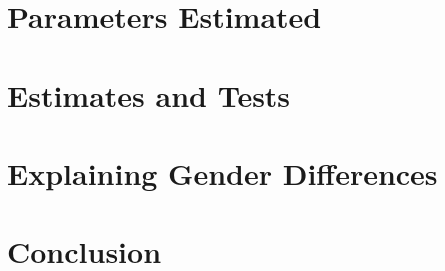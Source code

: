 \section{Parameters Estimated}
\label{sec:parameters}


\section{Estimates and Tests}
\label{sec:treatment-effects}


\section{Explaining Gender Differences}
\label{sec:gender-differences}


\section{Conclusion}
\label{sec:conclusion}


\clearpage
\singlespacing




